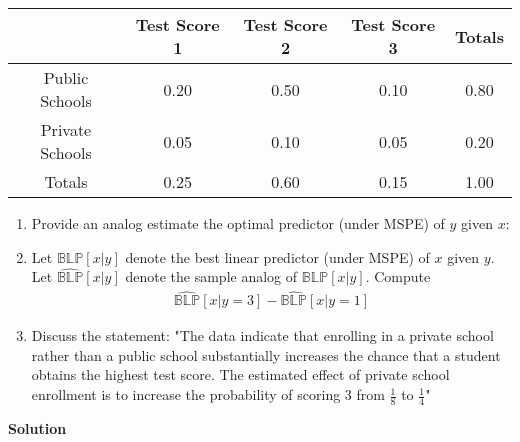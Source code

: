 \documentclass[a4paper]{article}
\begin{document}
	\begin{center} 
		\begin{tabular}{ c|ccc|c } 
			\hline 
			& Test Score 1&Test Score 2&Test Score 3&Totals\\ 
			\hline 
			Public Schools & 0.20& 0.50& 0.10 &0.80\\
			Private Schools& 0.05& 0.10& 0.05 &0.20\\
			\hline
			Totals & 0.25 &0.60 &0.15 &1.00\\
			\hline
		\end{tabular} 
	\end{center}
\begin{enumerate}
	\item Provide an analog estimate the optimal predictor (under MSPE) of $y$ given $x$:
	\item Let $\mathbb{BLP}[x|y]$ denote the best linear predictor (under MSPE) of $x$ given $y$.
	Let $\widehat{\mathbb{BLP}}[x|y]$ denote the sample analog of $\mathbb{BLP}[x|y]$. Compute
	\begin{align*}
	\widehat{\mathbb{BLP}}[x|y = 3] - \widehat{\mathbb{BLP}}[x|y = 1]
	\end{align*}
	\item Discuss the statement: "The data indicate that enrolling in a private school
	rather than a public school substantially increases the chance that a student obtains the
	highest test score. The estimated effect of private school enrollment is to increase the
	probability of scoring 3 from $\frac{1}{8}$ to $\frac{1}{4}$"
\end{enumerate}


\textbf{Solution}
\end{document}
